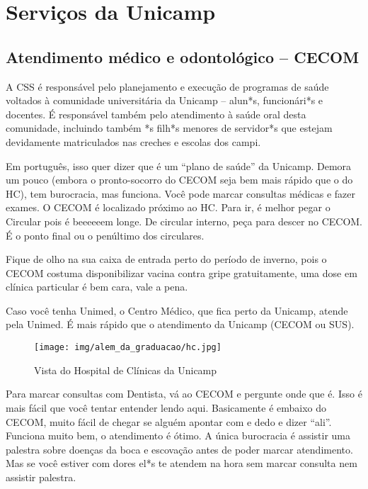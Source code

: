 
\section{Serviços da Unicamp}
\subsection{Atendimento médico e odontológico -- CECOM}

A CSS é responsável pelo planejamento e execução de programas de saúde voltados
à comunidade universitária da Unicamp -- alun*s, funcionári*s e docentes.  É
responsável também pelo atendimento à saúde oral desta comunidade, incluindo
também *s filh*s menores de servidor*s que estejam devidamente matriculados nas
creches e escolas dos campi.

Em português, isso quer dizer que é um ``plano de saúde'' da Unicamp. Demora um
pouco (embora o pronto-socorro do CECOM seja bem mais rápido que o do HC), tem
burocracia, mas funciona. Você pode marcar consultas médicas e fazer exames.  O
CECOM é localizado próximo ao HC. Para ir, é melhor pegar o Circular pois é
beeeeeem longe. De circular interno, peça para descer no CECOM. É o ponto final
ou o penúltimo dos circulares.

Fique de olho na sua caixa de entrada perto do período de inverno, pois o CECOM
costuma disponibilizar vacina contra gripe gratuitamente, uma dose em clínica
particular é bem cara, vale a pena.

Caso você tenha Unimed, o Centro Médico, que fica perto da Unicamp, atende pela
Unimed. É mais rápido que o atendimento da Unicamp (CECOM ou SUS).

\begin{figure}[h!]
    \centering
    \texttt{[image: img/alem\_da\_graduacao/hc.jpg]}
    \caption{Vista do Hospital de Clínicas da Unicamp}
\end{figure}

Para marcar consultas com Dentista, vá ao CECOM e pergunte onde que é. Isso é
mais fácil que você tentar entender lendo aqui. Basicamente é embaixo do CECOM,
muito fácil de chegar se alguém apontar com e dedo e dizer ``ali''. Funciona
muito bem, o atendimento é ótimo. A única burocracia é assistir uma palestra
sobre doenças da boca e escovação antes de poder marcar atendimento. Mas se você
estiver com dores el*s te atendem na hora sem marcar consulta nem assistir
palestra.

